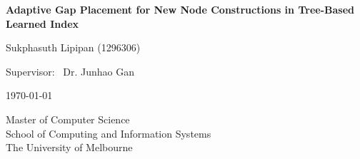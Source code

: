 \begin{titlepage}
   \begin{center}
        \vspace*{1cm}
        \huge
        \textbf{Adaptive Gap Placement for New Node Constructions in Tree-Based Learned Index}

        \vspace{1.5cm}
        \Large
        Sukphasuth Lipipan (1296306)

        \vspace{0.5cm}
        \Large
        Supervisor: \
        Dr. Junhao Gan

    
        
        \vspace{0.5cm}
        \Large
        \today

        \vspace{0.8cm}
        \Large
        Master of Computer Science\\
        School of Computing and Information Systems\\
        The University of Melbourne\\
   \end{center}
\end{titlepage}